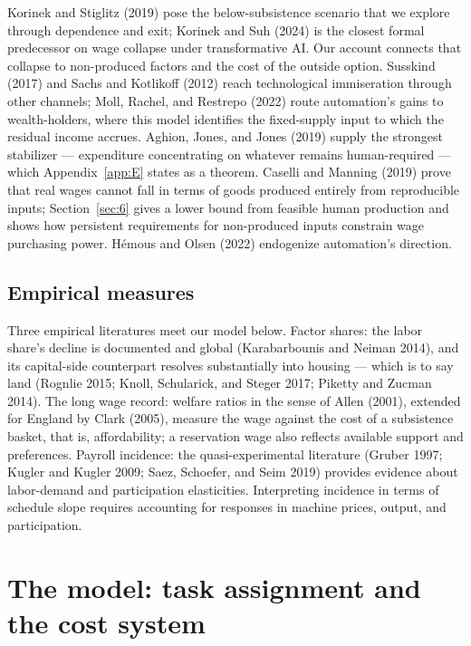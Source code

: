\documentclass[12pt]{article}
\theoremstyle{plain}
\begin{document}
Korinek and Stiglitz (2019) pose the below-subsistence scenario that we explore through dependence and exit; Korinek and Suh (2024) is the closest formal predecessor on wage collapse under transformative AI. Our account connects that collapse to non-produced factors and the cost of the outside option. Susskind (2017) and Sachs and Kotlikoff (2012) reach technological immiseration through other channels; Moll, Rachel, and Restrepo (2022) route automation's gains to wealth-holders, where this model identifies the fixed-supply input to which the residual income accrues. Aghion, Jones, and Jones (2019) supply the strongest stabilizer --- expenditure concentrating on whatever remains human-required --- which Appendix~\ref{app:E} states as a theorem. Caselli and Manning (2019) prove that real wages cannot fall in terms of goods produced entirely from reproducible inputs; Section~\ref{sec:6} gives a lower bound from feasible human production and shows how persistent requirements for non-produced inputs constrain wage purchasing power. Hémous and Olsen (2022) endogenize automation's direction.

\subsection{Empirical measures}\label{sec:2.7}

Three empirical literatures meet our model below. Factor shares: the labor share's decline is documented and global (Karabarbounis and Neiman 2014), and its capital-side counterpart resolves substantially into housing --- which is to say land (Rognlie 2015; Knoll, Schularick, and Steger 2017; Piketty and Zucman 2014). The long wage record: welfare ratios in the sense of Allen (2001), extended for England by Clark (2005), measure the wage against the cost of a subsistence basket, that is, affordability; a reservation wage also reflects available support and preferences. Payroll incidence: the quasi-experimental literature (Gruber 1997; Kugler and Kugler 2009; Saez, Schoefer, and Seim 2019) provides evidence about labor-demand and participation elasticities. Interpreting incidence in terms of schedule slope requires accounting for responses in machine prices, output, and participation.

\section{The model: task assignment and the cost system}\label{sec:3}
\end{document}
